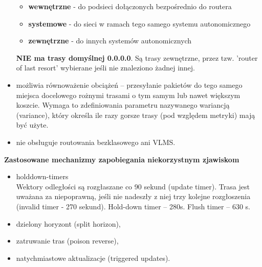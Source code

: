 \documentclass[../main.tex]{subfiles}
\begin{document}
\begin{itemize}
        \begin{itemize}
            \item \textbf{wewnętrzne} - do podsieci dołączonych bezpośrednio do routera
            \item \textbf{systemowe} - do sieci w ramach tego samego systemu autonomicznego
            \item \textbf{zewnętrzne} - do innych systemów autonomicznych
        \end{itemize}
        \textbf{NIE ma trasy domyślnej 0.0.0.0}. Są trasy zewnętrzne, przez tzw. 'router of last resort'
        wybierane jeśli nie znaleziono żadnej innej.
        \item możliwia równoważenie obciążeń – przesyłanie pakietów do tego samego miejsca
        docelowego rożnymi trasami o tym samym lub nawet większym koszcie. Wymaga to
        zdefiniowania parametru nazywanego wariancją (variance), który określa ile razy gorsze
        trasy (pod względem metryki) mają być użyte.
        \item nie obsługuje routowania bezklasowego ani VLMS.
    \end{itemize}


    \textbf{Zastosowane mechanizmy zapobiegania niekorzystnym zjawiskom}
    \begin{itemize}
        \item holddown-timers\\
        Wektory odległości są rozgłaszane co 90 sekund (update timer). Trasa jest uważana za
        niepoprawną, jeśli nie nadeszły z niej trzy kolejne rozgłoszenia (invalid timer - 270 sekund).
        Hold-down timer – 280s. Flush timer – 630 s.
        \item dzielony horyzont (split horizon),
        \item zatruwanie tras (poison reverse),
        \item natychmiastowe aktualizacje (triggered updates).
    \end{itemize}
\end{document}
